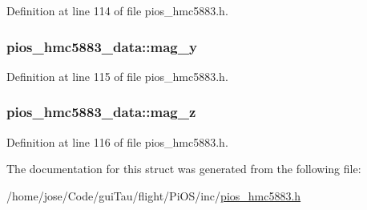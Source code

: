 Definition at line 114 of file pios\-\_\-hmc5883.\-h.

\hypertarget{structpios__hmc5883__data_a707b18d498bd59bdee07421a6010c616}{
\subsubsection[{mag\-\_\-y}]{ pios\-\_\-hmc5883\-\_\-data\-::mag\-\_\-y}}\label{structpios__hmc5883__data_a707b18d498bd59bdee07421a6010c616}


Definition at line 115 of file pios\-\_\-hmc5883.\-h.

\hypertarget{structpios__hmc5883__data_a03ffa9851eac28313edf9c6cc0a9cdd0}{
\subsubsection[{mag\-\_\-z}]{ pios\-\_\-hmc5883\-\_\-data\-::mag\-\_\-z}}\label{structpios__hmc5883__data_a03ffa9851eac28313edf9c6cc0a9cdd0}


Definition at line 116 of file pios\-\_\-hmc5883.\-h.



The documentation for this struct was generated from the following file\-:\begin{DoxyCompactItemize}
\item 
/home/jose/\-Code/gui\-Tau/flight/\-Pi\-O\-S/inc/\hyperlink{pios__hmc5883_8h}{pios\-\_\-hmc5883.\-h}\end{DoxyCompactItemize}
